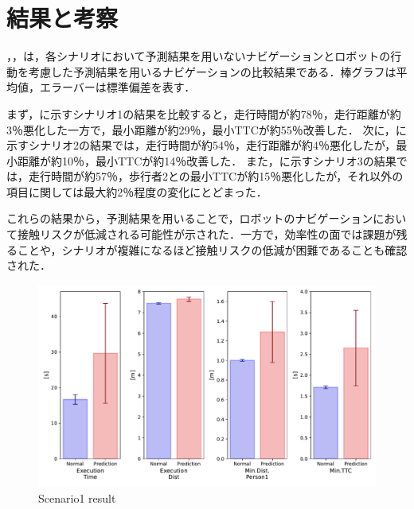 \section{結果と考察}\label{sec:exp-sim-result}
，，は，各シナリオにおいて予測結果を用いないナビゲーションとロボットの行動を考慮した予測結果を用いるナビゲーションの比較結果である．棒グラフは平均値，エラーバーは標準偏差を表す．

まず，に示すシナリオ1の結果を比較すると，走行時間が約78％，走行距離が約3％悪化した一方で，最小距離が約29％，最小TTCが約55％改善した．
次に，に示すシナリオ2の結果では，走行時間が約54％，走行距離が約4％悪化したが，最小距離が約10％，最小TTCが約14％改善した．
また，に示すシナリオ3の結果では，走行時間が約57％，歩行者2との最小TTCが約15％悪化したが，それ以外の項目に関しては最大約2％程度の変化にとどまった．

これらの結果から，予測結果を用いることで，ロボットのナビゲーションにおいて接触リスクが低減される可能性が示された．一方で，効率性の面では課題が残ることや，シナリオが複雑になるほど接触リスクの低減が困難であることも確認された．

\vspace{10pt}

\begin{figure}[H]
  \centering
 \includegraphics[keepaspectratio, scale=0.53]
      {images/scenario1_result.pdf}
  \caption{Scenario1 result}
 \label{Fig:scenario1-result}
\end{figure} 

\newpage

